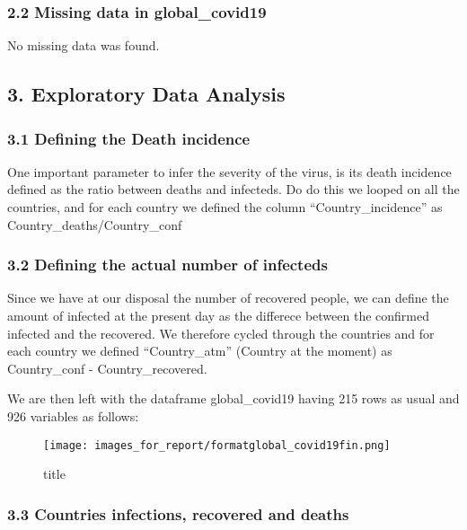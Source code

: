 \documentclass[11pt]{article}
\makeatletter
\def\maxwidth{\ifdim\Gin@nat@width>\linewidth\linewidth
    \else\Gin@nat@width\fi}
\let\Oldincludegraphics\includegraphics
\renewcommand{\includegraphics}[1]{\Oldincludegraphics[width=.8\maxwidth]{#1}}
\makeatother
\begin{document}
\hypertarget{missing-data-in-global_covid19}{%
\subsubsection{2.2 Missing data in
global\_covid19}\label{missing-data-in-global_covid19}}

No missing data was found.

    \hypertarget{exploratory-data-analysis}{%
\subsection{3. Exploratory Data
Analysis}\label{exploratory-data-analysis}}

\hypertarget{defining-the-death-incidence}{%
\subsubsection{3.1 Defining the Death
incidence}\label{defining-the-death-incidence}}

One important parameter to infer the severity of the virus, is its death
incidence defined as the ratio between deaths and infecteds. Do do this
we looped on all the countries, and for each country we defined the
column ``Country\_incidence'' as Country\_deaths/Country\_conf

\hypertarget{defining-the-actual-number-of-infecteds}{%
\subsubsection{3.2 Defining the actual number of
infecteds}\label{defining-the-actual-number-of-infecteds}}

Since we have at our disposal the number of recovered people, we can
define the amount of infected at the present day as the differece
between the confirmed infected and the recovered. We therefore cycled
through the countries and for each country we defined ``Country\_atm''
(Country at the moment) as Country\_conf - Country\_recovered.

We are then left with the dataframe global\_covid19 having 215 rows as
usual and 926 variables as follows:

\begin{figure}
\centering
\texttt{[image: images\_for\_report/formatglobal\_covid19fin.png]}
\caption{title}
\end{figure}

\hypertarget{countries-infections-recovered-and-deaths}{%
\subsubsection{3.3 Countries infections, recovered and
deaths}\label{countries-infections-recovered-and-deaths}}
\end{document}
